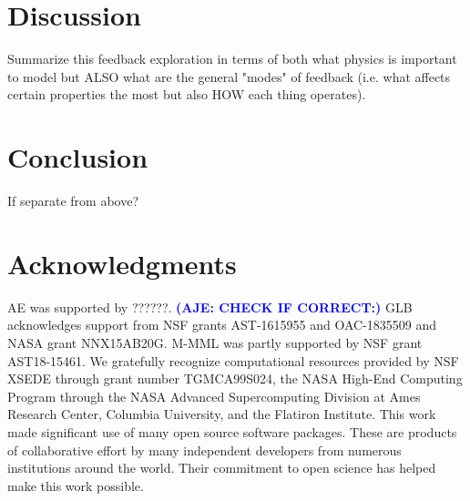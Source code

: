 \documentclass[twocolumn]{aastex62}
\newcommand{\aje}[1]{\textcolor{blue}{\textbf{(AJE: #1)}}}
\begin{document}
\section{Discussion}

Summarize this feedback exploration in terms of both what physics is important to model but ALSO what are the general "modes" of feedback (i.e. what affects certain properties the most but also HOW each thing operates). 


\section{Conclusion}
If separate from above?

\section*{Acknowledgments} AE was supported by ??????. \aje{CHECK IF CORRECT:} GLB acknowledges support from NSF grants AST-1615955 and OAC-1835509 and NASA grant NNX15AB20G. M-MML was partly supported by NSF grant AST18-15461. We gratefully recognize computational resources provided by NSF XSEDE through grant number TGMCA99S024, the NASA High-End Computing Program through the NASA Advanced Supercomputing Division at Ames Research Center, Columbia University, and the Flatiron Institute. This work made significant use of many open source software packages. These are products of collaborative effort by many independent developers from numerous institutions around the world. Their commitment to open science has helped make this work possible. 


\end{document}
